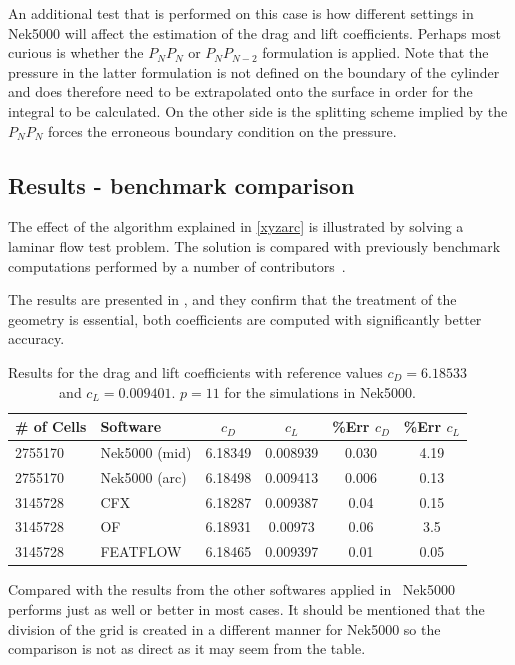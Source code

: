 An additional test that is performed on this case is how different settings in Nek5000 will affect the estimation of the drag and lift coefficients.
Perhaps most curious is whether the $P_NP_N$ or $P_NP_{N-2}$ formulation is applied. Note that the pressure in the latter formulation is 
not defined on the boundary of the cylinder and does therefore need to be extrapolated onto the surface in order for the integral to be 
calculated. On the other side is the splitting scheme implied by the $P_NP_N$ forces the erroneous boundary condition on the pressure.
%
\subsection{Results - benchmark comparison}
The effect of the algorithm explained in \cref{xyzarc} is
illustrated by solving a laminar flow test problem. 
The solution is compared with previously benchmark computations performed by a number of 
contributors~\cite{benchmark}. 

The results are presented in , and they confirm that the treatment of the geometry is 
essential, both coefficients are computed with significantly better accuracy. 
%
\begin{table}[h]
\centering
\begin{tabular}{l l c c c c}
		\toprule
		\# of Cells & Software & $c_D$ & $c_L$ & \%\textbf{Err} $c_D$ &\%\textbf{Err} $c_L$ \\ \midrule 
		2755170& Nek5000 (mid) & 6.18349 & 0.008939 & 0.030 & 4.19 \\ 
		2755170& Nek5000 (arc) & 6.18498 & 0.009413 & 0.006 & 0.13 \\
		3145728 & CFX 		 & 6.18287 & 0.009387 & 0.04 &0.15 \\
		3145728 & OF	     & 6.18931 & 0.00973 & 0.06 &3.5 \\
		3145728 & FEATFLOW   & 6.18465 & 0.009397 & 0.01 &0.05 \\
		\bottomrule	
	\end{tabular}
	\caption{Results for the drag and lift coefficients with reference values 
	$c_D = 6.18533$ and $c_L = 0.009401$. $p=11$ for the simulations in Nek5000.}
\label{tab:testcase}
\end{table}
%
Compared with the results from the other softwares applied in~\cite{benchmark} Nek5000 performs 
just as well or better in most cases. It should be mentioned that the division of the grid is created
in a different manner for Nek5000 so the comparison is not as direct as it may seem from the table.

